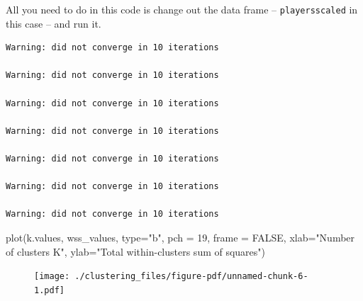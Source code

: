 \documentclass[
  letterpaper,
  DIV=11,
  numbers=noendperiod]{scrreprt}
\newenvironment{Shaded}{\begin{snugshade}}{\end{snugshade}}
\newcommand{\AttributeTok}[1]{\textcolor[rgb]{0.40,0.45,0.13}{#1}}
\newcommand{\CommentTok}[1]{\textcolor[rgb]{0.37,0.37,0.37}{#1}}
\newcommand{\ConstantTok}[1]{\textcolor[rgb]{0.56,0.35,0.01}{#1}}
\newcommand{\ControlFlowTok}[1]{\textcolor[rgb]{0.00,0.23,0.31}{#1}}
\newcommand{\DecValTok}[1]{\textcolor[rgb]{0.68,0.00,0.00}{#1}}
\newcommand{\FunctionTok}[1]{\textcolor[rgb]{0.28,0.35,0.67}{#1}}
\newcommand{\NormalTok}[1]{\textcolor[rgb]{0.00,0.23,0.31}{#1}}
\newcommand{\OtherTok}[1]{\textcolor[rgb]{0.00,0.23,0.31}{#1}}
\newcommand{\SpecialCharTok}[1]{\textcolor[rgb]{0.37,0.37,0.37}{#1}}
\newcommand{\StringTok}[1]{\textcolor[rgb]{0.13,0.47,0.30}{#1}}
\begin{document}
All you need to do in this code is change out the data frame --
\texttt{playersscaled} in this case -- and run it.

\begin{Shaded}
\end{Shaded}

\begin{verbatim}
Warning: did not converge in 10 iterations

Warning: did not converge in 10 iterations

Warning: did not converge in 10 iterations

Warning: did not converge in 10 iterations

Warning: did not converge in 10 iterations

Warning: did not converge in 10 iterations

Warning: did not converge in 10 iterations
\end{verbatim}

\begin{Shaded}
\begin{Highlighting}[]
\FunctionTok{plot}\NormalTok{(k.values, wss\_values,}
       \AttributeTok{type=}\StringTok{"b"}\NormalTok{, }\AttributeTok{pch =} \DecValTok{19}\NormalTok{, }\AttributeTok{frame =} \ConstantTok{FALSE}\NormalTok{, }
       \AttributeTok{xlab=}\StringTok{"Number of clusters K"}\NormalTok{,}
       \AttributeTok{ylab=}\StringTok{"Total within{-}clusters sum of squares"}\NormalTok{)}
\end{Highlighting}
\end{Shaded}

\begin{figure}[H]

{\centering \texttt{[image: ./clustering\_files/figure-pdf/unnamed-chunk-6-1.pdf]}

}

\end{figure}
\end{document}
